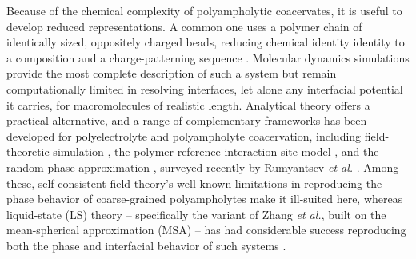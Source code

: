\documentclass[journal=amlccd,manuscript=article,layout=twocolumn]{achemso}
\begin{document}
Because of the chemical complexity of polyampholytic coacervates, it is useful to develop reduced representations. A common one uses a polymer chain of identically sized, oppositely charged beads, reducing chemical identity identity to a composition and a charge-patterning sequence \cite{dignonSequenceDeterminantsProtein2018}. Molecular dynamics simulations provide the most complete description of such a system but remain computationally limited in resolving interfaces, let alone any interfacial potential it carries, for macromolecules of realistic length\cite{anEffectsChargeAsymmetry2024,zhouSequenceLengthscaleDependent2026,wangSequencedependentConformationalTransitions2024,leeRoleChargeSequence2024,dignonTemperatureControlledLiquidLiquid2019}. Analytical theory offers a practical alternative, and a range of complementary frameworks has been developed for polyelectrolyte and polyampholyte coacervation, including field-theoretic simulation \cite{leeComplexCoacervationField2008,mccartyCompletePhaseDiagram2019,danielsenSmallIonEffects2019,danielsenMolecularDesignSelfcoacervation2019}, the polymer reference interaction site model \cite{perryPRISMBasedTheoryComplex2015}, and the random phase approximation \cite{borueStatisticalTheoryGlobular1990,castelnovoComplexationOppositelyCharged2001,danielsenMolecularDesignSelfcoacervation2019,rumyantsevUnifyingWeakStrong2022}, surveyed recently by Rumyantsev \textit{et al.} \cite{rumyantsevPolyelectrolyteComplexCoacervates2021}. Among these, self-consistent field theory's well-known limitations in reproducing the phase behavior of coarse-grained polyampholytes make it ill-suited here, whereas liquid-state (LS) theory -- specifically the variant of Zhang \textit{et al.}, built on the mean-spherical approximation (MSA) -- has had considerable success reproducing both the phase and interfacial behavior of such systems \cite{zhangSaltingOutSaltingInPolyelectrolyte2016,wangInterfacialTensionsPolyelectrolyte2024,leeRoleChargeSequence2024}.
\end{document}
